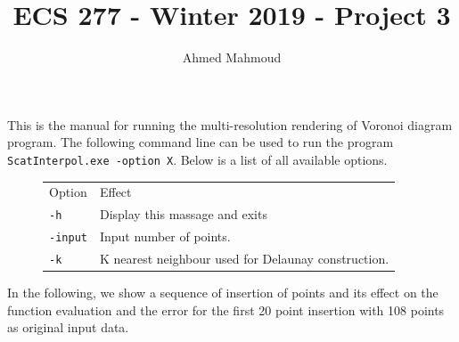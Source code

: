 \documentclass[12pt]{article}
\begin{document}
\captionsetup[subfigure]{labelformat=empty}

\title{ECS 277 - Winter 2019 - Project 3}
\author{Ahmed Mahmoud}
\date{} 

\maketitle

This is the manual for running the multi-resolution rendering of Voronoi diagram program. The following command line can be used to run the program \texttt{ScatInterpol.exe -option X}. Below is a list of all available options.

\begin{figure}  [!tbh]
\begin{tabular}{ |l| l|}
  \hline
  Option & Effect   \\ \hhline{|=|=|}
  \texttt{-h}         & Display this massage and exits \\
  \texttt{-input}     & Input number of points. \\
  \texttt{-k}     &  K nearest neighbour used for Delaunay construction.     \\
  \hline
\end{tabular}    
\end{figure} 
	    

In the following, we show a sequence of insertion of points and its effect on the function evaluation and the error for the first 20 point insertion with 108 points as original input data. 

	        	        
\end{document}
